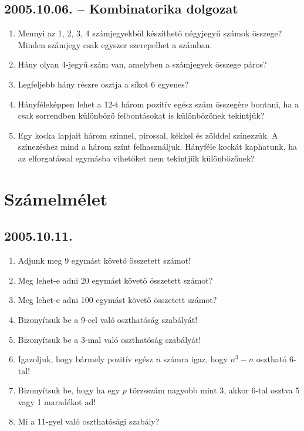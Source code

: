 \subsection*{2005.10.06. -- Kombinatorika dolgozat}
\begin{enumerate}
\item Mennyi az 1, 2, 3, 4 számjegyekből készíthető
négyjegyű számok összege? Minden számjegy csak egyszer szerepelhet a számban.
\item Hány olyan 4-jegyű szám van, amelyben a számjegyek összege páros?
\item Legfeljebb hány részre osztja a síkot 6 egyenes?
\item Hányféleképpen lehet a 12-t három pozitív egész szám összegére bontani, ha a csak sorrendben különböző felbontásokat is különbözőnek tekintjük?
\item Egy kocka lapjait három színnel, pirossal, kékkel és zölddel színezzük. A színezéshez mind a három színt felhasználjuk.
Hányféle kockát kaphatunk, ha az elforgatással egymásba vihetőket nem tekintjük különbözőnek?
\end{enumerate}


\section{Számelmélet}

\subsection*{2005.10.11.}
\begin{enumerate}
\item Adjunk meg 9 egymást követő összetett számot!

\item Meg lehet-e adni 20 egymást követő összetett számot?

\item Meg lehet-e adni 100 egymást követő összetett számot?

\item Bizonyítsuk be a 9-cel való oszthatóság szabályát!

\item Bizonyítsuk be a 3-mal való oszthatóság szabályát!

\item Igazoljuk, hogy bármely pozitív egész $n$ számra igaz, hogy $n^3-n$ osztható 6-tal!

\item Bizonyítsuk be, hogy ha egy $p$ törzsszám nagyobb mint 3, akkor 6-tal osztva 5 vagy 1 maradékot ad!

\item Mi a 11-gyel való oszthatósági szabály?

\end{enumerate}

